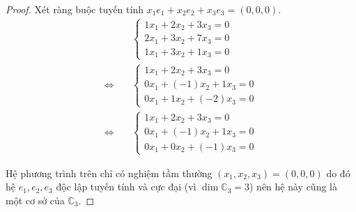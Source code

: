 \documentclass[class=linear-algebra,crop=false]{standalone}
\begin{document}
\begin{proof}Xét ràng buộc tuyến tính $x_{1}e_{1} + x_{2}e_{2} + x_{3}e_{3} = (0, 0, 0)$.
    \begin{align*}
                             & \begin{cases}
                                   1x_{1} + 2x_{2} + 3x_{3} = 0 \\
                                   2x_{1} + 3x_{2} + 7x_{3} = 0 \\
                                   1x_{1} + 3x_{2} + 1x_{3} = 0
                               \end{cases} \\
        \Leftrightarrow\quad &
        \begin{cases}
            1x_{1} + 2x_{2} + 3x_{3} = 0    \\
            0x_{1} + (-1)x_{2} + 1x_{3} = 0 \\
            0x_{1} + 1x_{2} + (-2)x_{3} = 0
        \end{cases}                     \\
        \Leftrightarrow\quad &
        \begin{cases}
            1x_{1} + 2x_{2} + 3x_{3} = 0    \\
            0x_{1} + (-1)x_{2} + 1x_{3} = 0 \\
            0x_{1} + 0x_{2} + (-1)x_{3} = 0
        \end{cases}
    \end{align*}
    \par Hệ phương trình trên chỉ có nghiệm tầm thường $(x_{1}, x_{2}, x_{3}) = (0, 0, 0)$ do đó hệ $e_{1}, e_{2}, e_{3}$ độc lập tuyến tính và cực đại (vì $\dim\mathbb{C}_{3} = 3$) nên hệ này cũng là một cơ sở của $\mathbb{C}_{3}$.


\end{proof}
\end{document}
